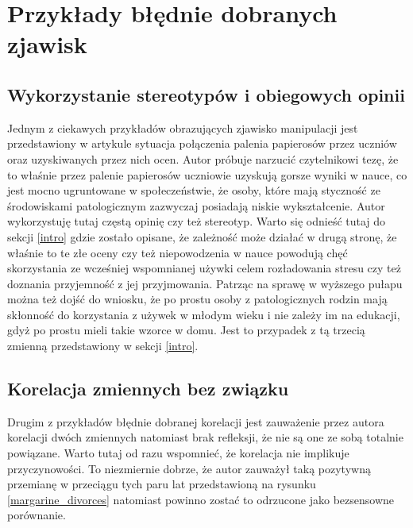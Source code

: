 \documentclass{classrep}
\begin{document}
    \section{Przykłady błędnie dobranych zjawisk}
    \label{wrong_examples} {

        \subsection{Wykorzystanie stereotypów i obiegowych opinii}
        \label{wrong_examples:stereotypes} {
            Jednym z ciekawych przykładów obrazujących zjawisko manipulacji jest
            przedstawiony w artykule \cite{medium_article} sytuacja połączenia palenia
            papierosów przez uczniów oraz uzyskiwanych przez nich ocen. Autor próbuje
            narzucić czytelnikowi tezę, że to właśnie przez palenie papierosów uczniowie
            uzyskują gorsze wyniki w nauce, co jest mocno ugruntowane w społeczeństwie, że
            osoby, które mają styczność ze środowiskami patologicznym zazwyczaj posiadają
            niskie wykształcenie. Autor wykorzystuję tutaj częstą opinię czy też
            stereotyp.
            Warto się odnieść tutaj do sekcji \ref{intro} gdzie zostało opisane, że
            zależność może działać w drugą stronę, że właśnie to te złe oceny czy też
            niepowodzenia w nauce powodują chęć skorzystania ze wcześniej wspomnianej
            używki celem rozładowania stresu czy też doznania przyjemność z jej
            przyjmowania. Patrząc na sprawę w wyższego pułapu można też dojść do
            wniosku, że po prostu osoby z patologicznych rodzin mają skłonność do
            korzystania z używek w młodym wieku i nie zależy im na edukacji, gdyż
            po prostu mieli takie wzorce w domu. Jest to przypadek z tą trzecią zmienną
            przedstawiony w sekcji \ref{intro}.
        }

        \subsection{Korelacja zmiennych bez związku}
        \label{wrong_examples:no_relationship} {
            Drugim z przykładów błędnie dobranej korelacji jest zauważenie przez autora
            korelacji dwóch zmiennych natomiast brak refleksji, że nie są one ze sobą
            totalnie powiązane. Warto tutaj od razu wspomnieć, że korelacja nie
            implikuje przyczynowości. To niezmiernie dobrze, że autor zauważył taką
            pozytywną przemianę w przeciągu tych paru lat przedstawioną na rysunku
            \ref{margarine_divorces} natomiast powinno zostać to odrzucone jako
            bezsensowne porównanie.

}}
\end{document}
